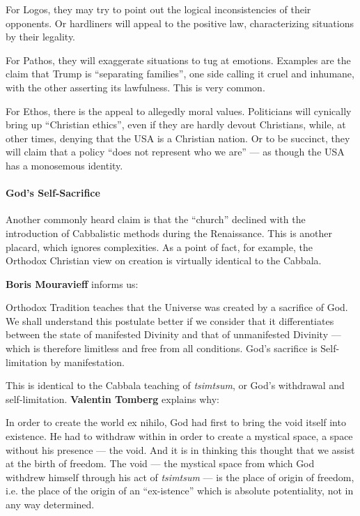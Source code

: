 For Logos, they may try to point out the logical inconsistencies of their opponents. Or hardliners will appeal to the positive law, characterizing situations by their legality.

For Pathos, they will exaggerate situations to tug at emotions. Examples are the claim that Trump is ``separating families'', one side calling it cruel and inhumane, with the other asserting its lawfulness. This is very common.

For Ethos, there is the appeal to allegedly moral values. Politicians will cynically bring up ``Christian ethics'', even if they are hardly devout Christians, while, at other times, denying that the USA is a Christian nation. Or to be succinct, they will claim that a policy ``does not represent who we are'' --- as though the USA has a monosemous identity.

\paragraph{God's Self-Sacrifice}


Another commonly heard claim is that the ``church'' declined with the introduction of Cabbalistic methods during the Renaissance. This is another placard, which ignores complexities. As a point of fact, for example, the Orthodox Christian view on creation is virtually identical to the Cabbala.

\textbf{Boris Mouravieff} informs us:


\begin{quotex}
Orthodox Tradition teaches that the Universe was created by a sacrifice of God. We shall understand this postulate better if we consider that it differentiates between the state of manifested Divinity and that of unmanifested Divinity --- which is therefore limitless and free from all conditions. God's sacrifice is Self-limitation by manifestation.
\end{quotex}


This is identical to the Cabbala teaching of \emph{tsimtsum}, or God's withdrawal and self-limitation. \textbf{Valentin Tomberg} explains why:

\begin{quotex}
In order to create the world ex nihilo, God had first to bring the void itself into existence. He had to withdraw within in order to create a mystical space, a space without his presence --- the void. And it is in thinking this thought that we assist at the birth of freedom. The void --- the mystical space from which God withdrew himself through his act of \emph{tsimtsum} --- is the place of origin of freedom, i.e. the place of the origin of an ``ex-istence'' which is absolute potentiality, not in any way determined.
\end{quotex}


